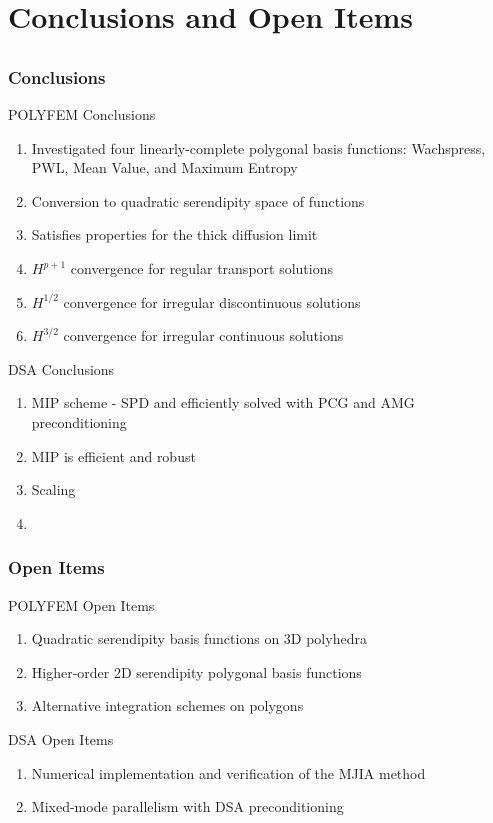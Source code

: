 \documentclass[compress,10pt]{beamer}
\begin{document}
\section{Conclusions and Open Items}
\subsection{}
\begin{frame}[t]\frametitle{Conclusions}
{
\begin{block}{POLYFEM Conclusions}
\begin{enumerate}
\item Investigated four linearly-complete polygonal basis functions: Wachspress, PWL, Mean Value, and Maximum Entropy
\item Conversion to quadratic serendipity space of functions
\item Satisfies properties for the thick diffusion limit
\item $H^{p+1}$ convergence for regular transport solutions
\item $H^{1/2}$ convergence for irregular discontinuous solutions
\item $H^{3/2}$ convergence for irregular continuous solutions
\end{enumerate}
\end{block}
}
{
\begin{block}{DSA Conclusions}
\begin{enumerate}
\item MIP scheme - SPD and efficiently solved with PCG and AMG preconditioning
\item MIP is efficient and robust
\item Scaling 
\item 
\end{enumerate}
\end{block}
}
\end{frame}
\begin{frame}[t]\frametitle{Open Items}
\begin{block}{POLYFEM Open Items}
\begin{enumerate}
\item Quadratic serendipity basis functions on 3D polyhedra
\item Higher-order 2D serendipity polygonal basis functions
\item Alternative integration schemes on polygons
\end{enumerate}
\end{block}
\begin{block}{DSA Open Items}
\begin{enumerate}
\item Numerical implementation and verification of the MJIA method
\item Mixed-mode parallelism with DSA preconditioning
\end{enumerate}
\end{block}
\end{frame}
\end{document}
